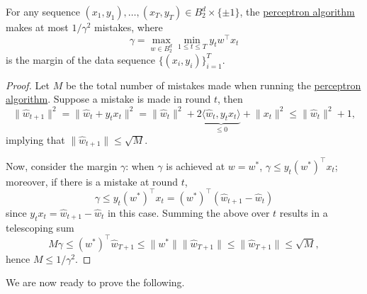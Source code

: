 \begin{lemma}\label{lma:perceptron-mistake-bound}
	For any sequence \((x_1, y_1), \ldots, (x_T, y_T) \in B_2^d \times \{\pm 1\}\), the \hyperref[algo:perceptron]{perceptron algorithm} makes at most \(1/\gamma^2\) mistakes, where
	\[
		\gamma = \max_{w \in B_2^d} \min_{1 \leq t \leq T} y_t w^{\top} x_t
	\]
	is the margin of the data sequence \(\{ (x_i, y_i) \} _{i = 1}^T\).
\end{lemma}
\begin{proof}
	Let \(M\) be the total number of mistakes made when running the \hyperref[algo:perceptron]{perceptron algorithm}. Suppose a mistake is made in round \(t\), then
	\[
		\lVert \hat{w}_{t+1} \rVert ^2
		= \lVert \hat{w}_t +y_t x_t \rVert ^2
		= \lVert \hat{w} _t \rVert ^2 + 2 \underbrace{\langle \hat{w} _t, y_t x_t \rangle}_{\leq 0} + \lVert x_t \rVert ^2
		\leq \lVert \hat{w}_t \rVert ^2 + 1,
	\]
	implying that \(\lVert \hat{w}_{t+1} \rVert \leq \sqrt{M}\).

	Now, consider the margin \(\gamma\): when \(\gamma \) is achieved at \(w = w^{\ast} \), \(\gamma \leq y_t (w^{\ast})^{\top} x_t\); moreover, if there is a mistake at round \(t\),
	\[
		\gamma
		\leq y_t (w^{\ast})^{\top} x_t
		= (w^{\ast})^{\top} (\hat{w}_{t+1} -\hat{w}_t)
	\]
	since \(y_t x_t = \hat{w} _{t+1} - \hat{w} _t\) in this case. Summing the above over \(t\) results in a telescoping sum
	\[
		M \gamma \leq (w^{\ast})^{\top} \hat{w}_{T+1}
		\leq \lVert w^{\ast} \rVert \lVert \hat{w}_{T+1} \rVert
		\leq \lVert \hat{w}_{T+1} \rVert
		\leq \sqrt{M},
	\]
	hence \(M \leq 1 / \gamma ^2\).
\end{proof}

We are now ready to prove the following.

